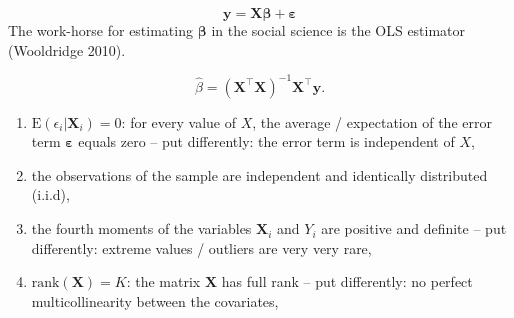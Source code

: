 \documentclass[
  letterpaper,
  DIV=11,
  numbers=noendperiod]{scrreprt}
\begin{document}
\[
{\boldsymbol{\mathbf{y}}}={\boldsymbol{\mathbf{X}}}{\boldsymbol{\mathbf{\beta}}}+ {\boldsymbol{\mathbf{\varepsilon}}}
\] The work-horse for estimating \(\boldsymbol{\mathbf{\beta}}\) in the
social science is the OLS estimator (Wooldridge 2010).

\[
\hat{\beta}=({\boldsymbol{\mathbf{X}}}^\intercal{\boldsymbol{\mathbf{X}}})^{-1}{\boldsymbol{\mathbf{X}}}^\intercal{\boldsymbol{\mathbf{y}}}.
\]

\begin{tcolorbox}[enhanced jigsaw, opacitybacktitle=0.6, left=2mm, leftrule=.75mm, toptitle=1mm, breakable, colback=white, bottomrule=.15mm, colframe=quarto-callout-important-color-frame, colbacktitle=quarto-callout-important-color!10!white, coltitle=black, bottomtitle=1mm, titlerule=0mm, title=\textcolor{quarto-callout-important-color}{\faExclamation}\hspace{0.5em}{OLS assumptions I}, opacityback=0, arc=.35mm, rightrule=.15mm, toprule=.15mm]

\begin{enumerate}
\def\labelenumi{\arabic{enumi}.}
\item
  \(\mathrm{E}(\epsilon_i|\boldsymbol{\mathbf{X}}_i) = 0\): for every
  value of \(X\), the average / expectation of the error term
  \(\boldsymbol{\mathbf{\varepsilon}}\) equals zero -- put differently:
  the error term is independent of \(X\),
\item
  the observations of the sample are independent and identically
  distributed (i.i.d),
\item
  the fourth moments of the variables \(\boldsymbol{\mathbf{X}}_i\) and
  \(Y_i\) are positive and definite -- put differently: extreme values /
  outliers are very very rare,
\item
  \(\text{rank}(\boldsymbol{\mathbf{X}}) = K\): the matrix
  \(\boldsymbol{\mathbf{X}}\) has full rank -- put differently: no
  perfect multicollinearity between the covariates,
\end{enumerate}

\end{tcolorbox}
\end{document}
